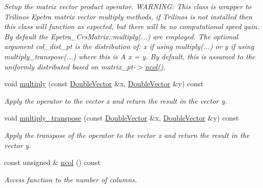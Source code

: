 \begin{DoxyCompactItemize}
\begin{DoxyCompactList}\small\item\em Setup the matrix vector product operator. W\+A\+R\+N\+I\+NG\+: This class is wrapper to Trilinos Epetra matrix vector multiply methods, if Trilinos is not installed then this class will function as expected, but there will be no computational speed gain. By default the Epetra\+\_\+\+Crs\+Matrix\+::multiply(...) are employed. The optional argument col\+\_\+dist\+\_\+pt is the distribution of\+: x if using multiply(...) or y if using multiply\+\_\+transpose(...) where this is A x = y. By default, this is assumed to the uniformly distributed based on matrix\+\_\+pt-\/$>$\hyperlink{classoomph_1_1MatrixVectorProduct_ab50c3dc351cd11050a979d30e421836f}{ncol()}. \end{DoxyCompactList}\item 
void \hyperlink{classoomph_1_1MatrixVectorProduct_ac29ba50f1a77bf0e316c3417bcff71ee}{multiply} (const \hyperlink{classoomph_1_1DoubleVector}{Double\+Vector} \&x, \hyperlink{classoomph_1_1DoubleVector}{Double\+Vector} \&y) const
\begin{DoxyCompactList}\small\item\em Apply the operator to the vector x and return the result in the vector y. \end{DoxyCompactList}\item 
void \hyperlink{classoomph_1_1MatrixVectorProduct_a2b7670797fe289ea814968f2f9469fd5}{multiply\+\_\+transpose} (const \hyperlink{classoomph_1_1DoubleVector}{Double\+Vector} \&x, \hyperlink{classoomph_1_1DoubleVector}{Double\+Vector} \&y) const
\begin{DoxyCompactList}\small\item\em Apply the transpose of the operator to the vector x and return the result in the vector y. \end{DoxyCompactList}\item 
const unsigned \& \hyperlink{classoomph_1_1MatrixVectorProduct_ab50c3dc351cd11050a979d30e421836f}{ncol} () const
\begin{DoxyCompactList}\small\item\em Access function to the number of columns. \end{DoxyCompactList}\end{DoxyCompactItemize}

